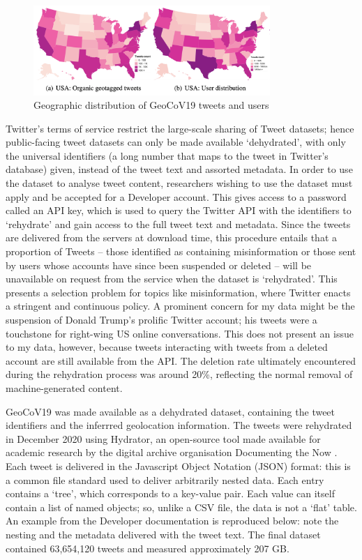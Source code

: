 \documentclass{article}
\begin{document}
\begin{figure}[h!]
    \includegraphics[width=0.8\textwidth]{figs/GeoCov-USdist.png}    
    \centering
    \caption{Geographic distribution of GeoCoV19 tweets and users \parencite{qaziGeoCoV19DatasetHundreds2020a}}
\end{figure}

Twitter's terms of service restrict the large-scale sharing of Tweet datasets; hence public-facing tweet datasets can only be made available `dehydrated', with only the universal identifiers (a long number that maps to the tweet in Twitter's database) given, instead of the tweet text and assorted metadata. In order to use the dataset to analyse tweet content, researchers wishing to use the dataset must apply and be accepted for a Developer account. This gives access to a password called an API key, which is used to query the Twitter API with the identifiers to `rehydrate' and gain access to the full tweet text and metadata. Since the tweets are delivered from the servers at download time, this procedure entails that a proportion of Tweets -- those identified as containing misinformation or those sent by users whose accounts have since been suspended or deleted -- will be unavailable on request from the service when the dataset is `rehydrated'. This presents a selection problem for topics like misinformation, where Twitter enacts a stringent and continuous policy. A prominent concern for my data might be the suspension of Donald Trump's prolific Twitter account; his tweets were a touchstone for right-wing US online conversations. This does not present an issue to my data, however, because tweets interacting with tweets from a deleted account are still available from the API. The deletion rate ultimately encountered during the rehydration process was around 20\%, reflecting the normal removal of machine-generated content.

GeoCoV19 was made available as a dehydrated dataset, containing the tweet identifiers and the inferrred geolocation information. The tweets were rehydrated in December 2020 using Hydrator, an open-source tool made available for academic research by the digital archive organisation Documenting the Now \parencite{summersHydrator2020}. Each tweet is delivered in the Javascript Object Notation (JSON) format: this is a common file standard used to deliver arbitrarily nested data. Each entry contains a `tree', which corresponds to a key-value pair. Each value can itself contain a list of named objects; so, unlike a CSV file, the data is not a `flat' table. An example from the Developer documentation is reproduced below: note the nesting and the metadata delivered with the tweet text. The final dataset contained 63,654,120 tweets and measured approximately 207 GB.
\end{document}
